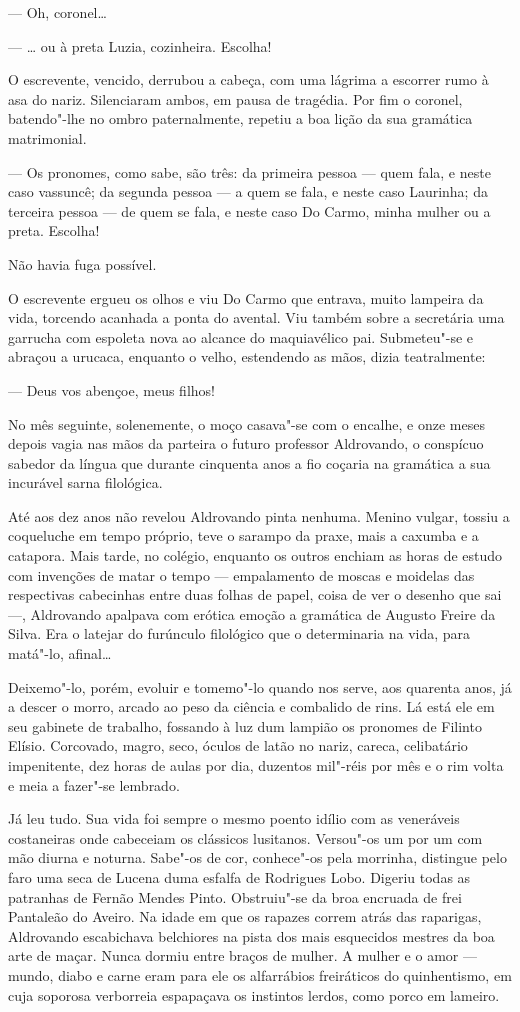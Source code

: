 --- Oh, coronel\ldots{}

--- \ldots{} ou à preta Luzia, cozinheira. Escolha!

O escrevente, vencido, derrubou a cabeça, com uma lágrima a escorrer
rumo à asa do nariz. Silenciaram ambos, em pausa de tragédia. Por fim o
coronel, batendo"-lhe no ombro paternalmente, repetiu a boa lição da sua
gramática matrimonial.

--- Os pronomes, como sabe, são três: da primeira pessoa --- quem fala,
e neste caso vassuncê; da segunda pessoa --- a quem se fala, e neste
caso Laurinha; da terceira pessoa --- de quem se fala, e neste caso Do
Carmo, minha mulher ou a preta. Escolha!

Não havia fuga possível.

O escrevente ergueu os olhos e viu Do Carmo que entrava, muito lampeira
da vida, torcendo acanhada a ponta do avental. Viu também sobre a
secretária uma garrucha com espoleta nova ao alcance do maquiavélico
pai. Submeteu"-se e abraçou a urucaca, enquanto o velho, estendendo as
mãos, dizia teatralmente:

--- Deus vos abençoe, meus filhos!

No mês seguinte, solenemente, o moço casava"-se com o encalhe, e onze
meses depois vagia nas mãos da parteira o futuro professor Aldrovando, o
conspícuo sabedor da língua que durante cinquenta anos a fio coçaria na
gramática a sua incurável sarna filológica.

Até aos dez anos não revelou Aldrovando pinta nenhuma. Menino vulgar,
tossiu a coqueluche em tempo próprio, teve o sarampo da praxe, mais a
caxumba e a catapora. Mais tarde, no colégio, enquanto os outros enchiam
as horas de estudo com invenções de matar o tempo --- empalamento de
moscas e moidelas das respectivas cabecinhas entre duas folhas de papel,
coisa de ver o desenho que sai ---, Aldrovando apalpava com erótica
emoção a gramática de Augusto Freire da Silva. Era o latejar do
furúnculo filológico que o determinaria na vida, para matá"-lo, afinal\ldots{}

Deixemo"-lo, porém, evoluir e tomemo"-lo quando nos serve, aos quarenta
anos, já a descer o morro, arcado ao peso da ciência e combalido de
rins. Lá está ele em seu gabinete de trabalho, fossando à luz dum
lampião os pronomes de Filinto Elísio. Corcovado, magro, seco, óculos de
latão no nariz, careca, celibatário impenitente, dez horas de aulas por
dia, duzentos mil"-réis por mês e o rim volta e meia a fazer"-se lembrado.

Já leu tudo. Sua vida foi sempre o mesmo poento idílio com as veneráveis
costaneiras onde cabeceiam os clássicos lusitanos. Versou"-os um por um
com mão diurna e noturna. Sabe"-os de cor, conhece"-os pela morrinha,
distingue pelo faro uma seca de Lucena duma esfalfa de Rodrigues Lobo.
Digeriu todas as patranhas de Fernão Mendes Pinto. Obstruiu"-se da broa
encruada de frei Pantaleão do Aveiro. Na idade em que os rapazes correm
atrás das raparigas, Aldrovando escabichava belchiores na pista dos mais
esquecidos mestres da boa arte de maçar. Nunca dormiu entre braços de
mulher. A mulher e o amor --- mundo, diabo e carne eram para ele os
alfarrábios freiráticos do quinhentismo, em cuja soporosa verborreia
espapaçava os instintos lerdos, como porco em lameiro.

